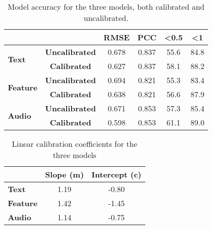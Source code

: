 \begin{table}[H]
    \centering
    \begin{tabular}{|lc|c|c|c|c|}
        \hline
        \multicolumn{2}{|l|}{\textbf{}}                         & \textbf{RMSE}         & \textbf{PCC} & \textbf{\textless 0.5} & \textbf{\textless 1}        \\ \hline
        \multicolumn{1}{|l|}{\multirow{2}{*}{\textbf{Text}}}    & \textbf{Uncalibrated} & 0.678        & 0.837                  & 55.6                 & 84.8 \\ \cline{2-6}
        \multicolumn{1}{|l|}{}                                  & \textbf{Calibrated}   & 0.627        & 0.837                  & 58.1                 & 88.2 \\ \hline
        \multicolumn{1}{|l|}{\multirow{2}{*}{\textbf{Feature}}} & \textbf{Uncalibrated} & 0.694        & 0.821                  & 55.3                 & 83.4 \\ \cline{2-6}
        \multicolumn{1}{|l|}{}                                  & \textbf{Calibrated}   & 0.638        & 0.821                  & 56.6                 & 87.9 \\ \hline
        \multicolumn{1}{|l|}{\multirow{2}{*}{\textbf{Audio}}}   & \textbf{Uncalibrated} & 0.671        & 0.853                  & 57.3                 & 85.4 \\ \cline{2-6}
        \multicolumn{1}{|l|}{}                                  & \textbf{Calibrated}   & 0.598        & 0.853                  & 61.1                 & 89.0 \\ \hline
    \end{tabular}
    \caption{Model accuracy for the three models, both calibrated and uncalibrated.}
    \label{tab:model_accuracy}
\end{table}

\begin{table}[H]
    \centering
    \begin{tabular}{|l|c|c|}
        \hline
        \textbf{}        & \textbf{Slope (m)} & \textbf{Intercept (c)} \\ \hline
        \textbf{Text}    & 1.19               & -0.80                  \\ \hline
        \textbf{Feature} & 1.42               & -1.45                  \\ \hline
        \textbf{Audio}   & 1.14               & -0.75                  \\ \hline
    \end{tabular}
    \caption{Linear calibration coefficients for the three models}
    \label{tab:linear_regression_coefficients}
\end{table}

